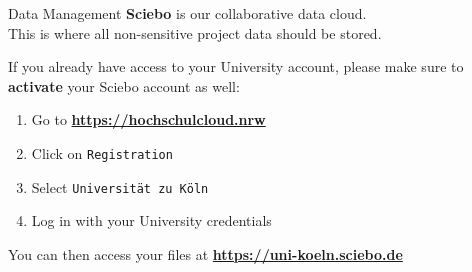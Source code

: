 \documentclass[
  ignorenonframetext,
  aspectratio=32,
]{beamer}
\providecommand{\tightlist}{%
  \setlength{\itemsep}{0pt}\setlength{\parskip}{0pt}}\usepackage{longtable,booktabs,array}
\begin{document}
\begin{frame}[fragile]{Data Management}
\label{data-management}
\textbf{Sciebo} is our collaborative data cloud.\\
This is where all non-sensitive project data should be stored.


\vspace*{-1cm}

If you already have access to your University account, please make sure
to \textbf{activate} your Sciebo account as well:

\begin{enumerate}
\tightlist
\item
  Go to
  \href{https://hochschulcloud.nrw/en/index.html}{\textbf{https://hochschulcloud.nrw}}
\item
  Click on \texttt{Registration}
\item
  Select \texttt{Universität\ zu\ Köln}
\item
  Log in with your University credentials
\end{enumerate}

You can then access your files at
\href{https://uni-koeln.sciebo.de/login}{\textbf{https://uni-koeln.sciebo.de}}
\end{frame}
\end{document}
